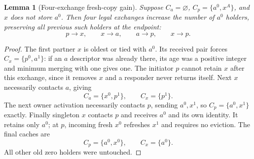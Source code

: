 \documentclass[11pt]{article}
\newtheorem{lemma}[theorem]{Lemma}
\begin{document}
\begin{lemma}[Four-exchange fresh-copy gain]
\label{lem:c2infection}
Suppose $C_a=\varnothing$, $C_p=\{a^0,x^A\}$,
and $x$ does not store $a^0$. Then four legal exchanges
increase the number of $a^0$ holders, preserving all
previous such holders at the endpoint:
\[
 p\to x,\qquad x\to a,\qquad a\to p,\qquad x\to p.
\]
\end{lemma}
\begin{proof}
The first partner $x$ is oldest or tied with $a^0$.
Its received pair forces $C_x=\{p^0,a^1\}$: if an
$a$ descriptor was already there, its age was a positive
integer and minimum merging with one gives one.
The initiator $p$ cannot retain $x$ after this exchange,
since it removes $x$ and a responder never returns itself.
Next $x$ necessarily contacts $a$, giving
\[
 C_a=\{x^0,p^1\},\qquad C_x=\{p^1\}.
\]
The next owner activation necessarily contacts $p$,
sending $a^0,x^1$, so $C_p=\{a^0,x^1\}$ exactly.
Finally singleton $x$ contacts $p$ and receives $a^0$
and its own identity. It retains only $a^0$; at $p$,
incoming fresh $x^0$ refreshes $x^1$ and requires no
eviction. The final caches are
\[
 C_p=\{a^0,x^0\},\qquad C_x=\{a^0\}.
\]
All other old zero holders were untouched.
\end{proof}
\end{document}
